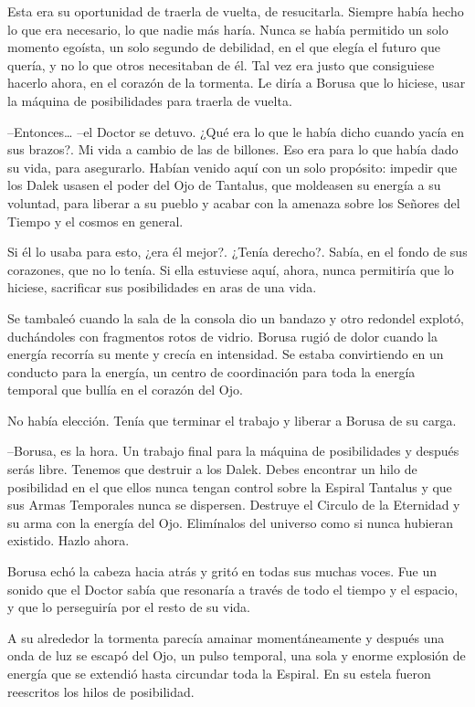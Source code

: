 Esta era su oportunidad de traerla de vuelta, de resucitarla. Siempre había hecho lo que era necesario, lo que nadie más haría. Nunca se había permitido un solo momento egoísta, un solo segundo de debilidad, en el que elegía el futuro que quería, y no lo que otros necesitaban de él. Tal vez era justo que consiguiese hacerlo ahora, en el corazón de la tormenta. Le diría a Borusa que lo hiciese, usar la máquina de posibilidades para traerla de vuelta.

--Entonces… --el Doctor se detuvo. ¿Qué era lo que le había dicho cuando yacía en sus brazos?. Mi vida a cambio de las de billones. Eso era para lo que había dado su vida, para asegurarlo. Habían venido aquí con un solo propósito: impedir que los Dalek usasen el poder del Ojo de Tantalus, que moldeasen su energía a su voluntad, para liberar a su pueblo y acabar con la amenaza sobre los Señores del Tiempo y el cosmos en general.

Si él lo usaba para esto, ¿era él mejor?. ¿Tenía derecho?. Sabía, en el fondo de sus corazones, que no lo tenía. Si ella estuviese aquí, ahora, nunca permitiría que lo hiciese, sacrificar sus posibilidades en aras de una vida.

Se tambaleó cuando la sala de la consola dio un bandazo y otro redondel explotó, duchándoles con fragmentos rotos de vidrio. Borusa rugió de dolor cuando la energía recorría su mente y crecía en intensidad. Se estaba convirtiendo en un conducto para la energía, un centro de coordinación para toda la energía temporal que bullía en el corazón del Ojo.

No había elección. Tenía que terminar el trabajo y liberar a Borusa de su carga. 

--Borusa, es la hora. Un trabajo final para la máquina de posibilidades y después serás libre. Tenemos que destruir a los Dalek. Debes encontrar un hilo de posibilidad en el que ellos nunca tengan control sobre la Espiral Tantalus y que sus Armas Temporales nunca se dispersen. Destruye el Circulo de la Eternidad y su arma con la energía del Ojo. Elimínalos del universo como si nunca hubieran existido. Hazlo ahora.

Borusa echó la cabeza hacia atrás y gritó en todas sus muchas voces. Fue  un sonido que el Doctor sabía que resonaría a través de todo el tiempo y el espacio, y que lo perseguiría por el resto de su vida.

A su alrededor la tormenta parecía amainar momentáneamente y después una onda de luz se escapó del Ojo, un pulso temporal, una sola y enorme explosión de energía que se extendió hasta circundar toda la Espiral. En su estela fueron reescritos los hilos de posibilidad.

